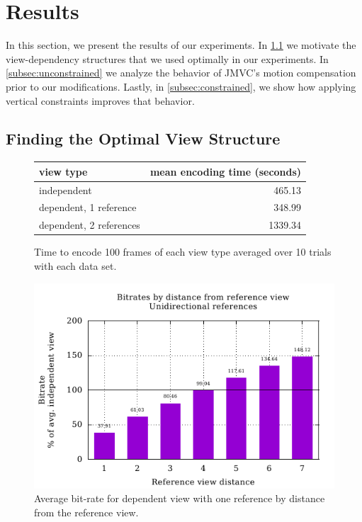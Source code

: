 \documentclass{sig-alternate-05-2015}
\begin{document}
\section{Results} %
\label{sec:results} %
In this section, we present the results of our experiments. In
\ref{subsec:optimal} we motivate the view-dependency structures that we used
optimally in our experiments. In \ref{subsec:unconstrained} we analyze the
behavior of JMVC's motion compensation prior to our modifications. Lastly, in
\ref{subsec:constrained}, we show how applying vertical constraints improves
that behavior.

\subsection{Finding the Optimal View Structure} %
\label{subsec:optimal} %

\begin{figure}[h]
\centering
\begin{tabular}{|l|r|}
\hline
view type               & mean encoding time (seconds) \\
\hline
independent             & 465.13                       \\
dependent, 1 reference  & 348.99                       \\
dependent, 2 references & 1339.34                      \\
\hline
\end{tabular}
\caption{Time to encode 100 frames of each view type averaged over 10 trials
with each data set.}
\label{fig:view-type-times}
\end{figure}

\begin{figure}[h]
\centering
\includegraphics[scale=.68]{figures/motion_vector_data_unconstrained_unidirectional.pdf}
\caption{
Average bit-rate for dependent view with one reference by distance from the
reference view.
}
\label{fig:uniframes}
\end{figure}
\end{document}
